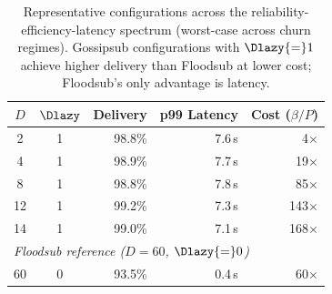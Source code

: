 \begin{table}[t]
      \centering
      \small
      \renewcommand{\arraystretch}{0.85}
      \caption{Representative configurations across the reliability-efficiency-latency
            spectrum (worst-case across churn regimes). Gossipsub configurations
            with $\Dlazy{=}1$ achieve higher delivery than Floodsub at lower cost;
            Floodsub's only advantage is latency.}
      \label{tab:recommendations}
      \begin{tabular}{ccrrr}
            \toprule
            $D$ & $\Dlazy$ & Delivery & p99 Latency & Cost ($\beta/P$)               \\
            \midrule
            2   & 1        & 98.8\%   & 7.6\,s      & 4$\times$                      \\
            4   & 1        & 98.9\%   & 7.7\,s      & 19$\times$                     \\
            8   & 1        & 98.8\%   & 7.8\,s      & 85$\times$                     \\
            12  & 1        & 99.2\%   & 7.3\,s      & 143$\times$                    \\
            14  & 1        & 99.0\%   & 7.1\,s      & 168$\times$                    \\
            \midrule
            \multicolumn{5}{l}{\textit{Floodsub reference ($D{=}60$, $\Dlazy{=}0$)}} \\
            60  & 0        & 93.5\%   & 0.4\,s      & 60$\times$                     \\
            \bottomrule
      \end{tabular}
\end{table}
